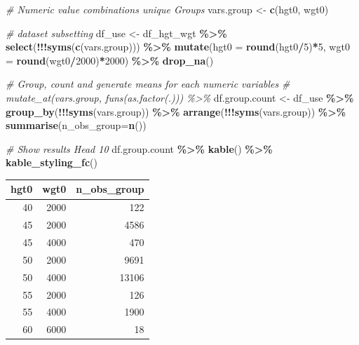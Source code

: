 \documentclass[
]{book}
\newenvironment{Shaded}{\begin{snugshade}}{\end{snugshade}}
\newcommand{\CommentTok}[1]{\textcolor[rgb]{0.56,0.35,0.01}{\textit{#1}}}
\newcommand{\DataTypeTok}[1]{\textcolor[rgb]{0.13,0.29,0.53}{#1}}
\newcommand{\DecValTok}[1]{\textcolor[rgb]{0.00,0.00,0.81}{#1}}
\newcommand{\KeywordTok}[1]{\textcolor[rgb]{0.13,0.29,0.53}{\textbf{#1}}}
\newcommand{\NormalTok}[1]{#1}
\newcommand{\OperatorTok}[1]{\textcolor[rgb]{0.81,0.36,0.00}{\textbf{#1}}}
\newcommand{\StringTok}[1]{\textcolor[rgb]{0.31,0.60,0.02}{#1}}
\begin{document}
\begin{Shaded}
\begin{Highlighting}[]
\CommentTok{\# Numeric value combinations unique Groups}
\NormalTok{vars.group \textless{}{-}}\StringTok{ }\KeywordTok{c}\NormalTok{(}\StringTok{\textquotesingle{}hgt0\textquotesingle{}}\NormalTok{, }\StringTok{\textquotesingle{}wgt0\textquotesingle{}}\NormalTok{)}

\CommentTok{\# dataset subsetting}
\NormalTok{df\_use \textless{}{-}}\StringTok{ }\NormalTok{df\_hgt\_wgt }\OperatorTok{\%\textgreater{}\%}\StringTok{ }\KeywordTok{select}\NormalTok{(}\OperatorTok{!!!}\KeywordTok{syms}\NormalTok{(}\KeywordTok{c}\NormalTok{(vars.group))) }\OperatorTok{\%\textgreater{}\%}
\StringTok{            }\KeywordTok{mutate}\NormalTok{(}\DataTypeTok{hgt0 =} \KeywordTok{round}\NormalTok{(hgt0}\OperatorTok{/}\DecValTok{5}\NormalTok{)}\OperatorTok{*}\DecValTok{5}\NormalTok{, }\DataTypeTok{wgt0 =} \KeywordTok{round}\NormalTok{(wgt0}\OperatorTok{/}\DecValTok{2000}\NormalTok{)}\OperatorTok{*}\DecValTok{2000}\NormalTok{) }\OperatorTok{\%\textgreater{}\%}
\StringTok{            }\KeywordTok{drop\_na}\NormalTok{()}

\CommentTok{\# Group, count and generate means for each numeric variables}
\CommentTok{\# mutate\_at(vars.group, funs(as.factor(.))) \%\textgreater{}\%}
\NormalTok{df.group.count \textless{}{-}}\StringTok{ }\NormalTok{df\_use }\OperatorTok{\%\textgreater{}\%}\StringTok{ }\KeywordTok{group\_by}\NormalTok{(}\OperatorTok{!!!}\KeywordTok{syms}\NormalTok{(vars.group)) }\OperatorTok{\%\textgreater{}\%}
\StringTok{                    }\KeywordTok{arrange}\NormalTok{(}\OperatorTok{!!!}\KeywordTok{syms}\NormalTok{(vars.group)) }\OperatorTok{\%\textgreater{}\%}
\StringTok{                    }\KeywordTok{summarise}\NormalTok{(}\DataTypeTok{n\_obs\_group=}\KeywordTok{n}\NormalTok{())}

\CommentTok{\# Show results Head 10}
\NormalTok{df.group.count }\OperatorTok{\%\textgreater{}\%}\StringTok{ }\KeywordTok{kable}\NormalTok{() }\OperatorTok{\%\textgreater{}\%}\StringTok{ }\KeywordTok{kable\_styling\_fc}\NormalTok{()}
\end{Highlighting}
\end{Shaded}

\begin{table}[!h]
\centering
\begin{tabular}{r|r|r}
\hline
hgt0 & wgt0 & n\_obs\_group\\
\hline
\rowcolor{gray!6}  40 & 2000 & 122\\
\hline
45 & 2000 & 4586\\
\hline
\rowcolor{gray!6}  45 & 4000 & 470\\
\hline
50 & 2000 & 9691\\
\hline
\rowcolor{gray!6}  50 & 4000 & 13106\\
\hline
55 & 2000 & 126\\
\hline
\rowcolor{gray!6}  55 & 4000 & 1900\\
\hline
60 & 6000 & 18\\
\hline
\end{tabular}
\end{table}
\end{document}
